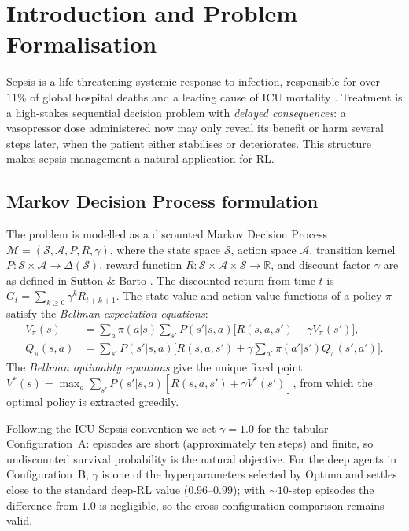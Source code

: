 \documentclass[11pt,a4paper]{article}
\begin{document}
\section{Introduction and Problem Formalisation}
\label{sec:intro}

Sepsis is a life-threatening systemic response to infection, responsible for over
$11\%$ of global hospital deaths and a leading cause of ICU mortality
\cite{komorowski2018}. Treatment is a high-stakes sequential decision problem with
\emph{delayed consequences}: a vasopressor dose administered now may only reveal its
benefit or harm several steps later, when the patient either stabilises or
deteriorates. This structure makes sepsis management a natural application for RL.

\subsection{Markov Decision Process formulation}
\label{sec:mdp}

The problem is modelled as a discounted Markov Decision Process
$\mathcal{M}=(\mathcal{S},\mathcal{A},P,R,\gamma)$, where the state space
$\mathcal{S}$, action space $\mathcal{A}$, transition kernel
$P:\mathcal{S}\times\mathcal{A}\to\Delta(\mathcal{S})$, reward function
$R:\mathcal{S}\times\mathcal{A}\times\mathcal{S}\to\mathbb{R}$, and discount factor
$\gamma$ are as defined in Sutton \& Barto \cite{sutton2018}. The discounted return
from time $t$ is $G_t = \sum_{k\ge 0}\gamma^k R_{t+k+1}$. The state-value and
action-value functions of a policy $\pi$ satisfy the \emph{Bellman expectation
equations}:
\begin{align}
V_\pi(s) &= \sum_a \pi(a|s)\sum_{s'} P(s'|s,a)\bigl[R(s,a,s')+\gamma V_\pi(s')\bigr], \\
Q_\pi(s,a) &= \sum_{s'}P(s'|s,a)\bigl[R(s,a,s')+\gamma\sum_{a'}\pi(a'|s')Q_\pi(s',a')\bigr].
\end{align}
The \emph{Bellman optimality equations} give the unique fixed point
$V^*(s)=\max_a\sum_{s'}P(s'|s,a)[R(s,a,s')+\gamma V^*(s')]$, from which the
optimal policy is extracted greedily.

Following the ICU-Sepsis convention we set $\gamma=1.0$ for the tabular
Configuration~A: episodes are short (approximately ten steps) and finite, so
undiscounted survival probability is the natural objective. For the deep agents
in Configuration~B, $\gamma$ is one of the hyperparameters selected by Optuna and
settles close to the standard deep-RL value ($0.96$--$0.99$); with $\sim10$-step
episodes the difference from $1.0$ is negligible, so the cross-configuration
comparison remains valid.
\end{document}
